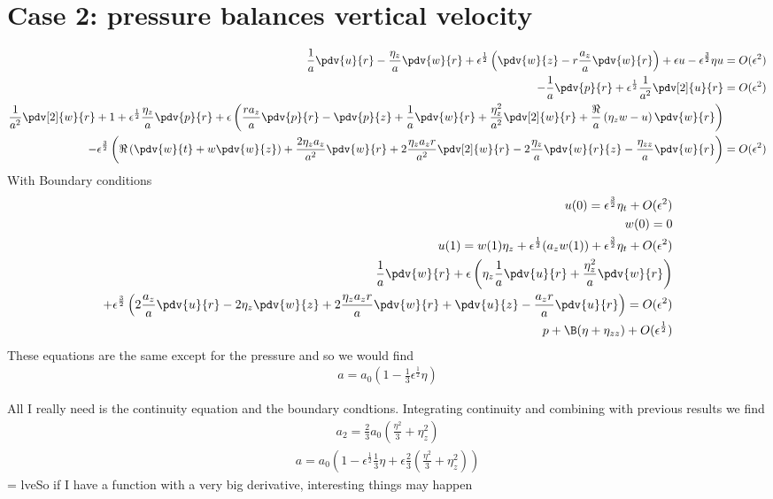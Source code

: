 \documentclass[12pt]{article}
\newcommand{\rt}{^{\frac{1}{2}}}
\newcommand{\rtt}{^{\frac{3}{2}}}
\begin{document}
\section{Case 2: pressure balances vertical velocity}
	\begin{align}
\frac{1}{a}\pdv{u}{r}-\frac{\eta_z}{a}\pdv{w}{r} +\epsilon\rt\left(\pdv{w}{z}-r\frac{a_z}{a}\pdv{w}{r}\right)+\epsilon u -\epsilon\rtt\eta u &= O(\epsilon^2)\\
-\frac{1}{a}\pdv{p}{r}+\epsilon\rt\frac{1}{a^2}\pdv[2]{u}{r} & = O(\epsilon^2)\\
\frac{1}{a^2}\pdv[2]{w}{r} + 1 +\epsilon\rt\frac{\eta_z}{a}\pdv{p}{r}+\epsilon\left(\frac{ra_z}{a}\pdv{p}{r}-\pdv{p}{z}+\frac{1}{a}\pdv{w}{r}+\frac{\eta_z^2}{a^2}\pdv[2]{w}{r}+\frac{\Re}{a}\left(\eta_z w-u\right)\pdv{w}{r}\right)&\\
-\epsilon\rtt\left(\Re\left(\pdv{w}{t}+w\pdv{w}{z}\right)+\frac{2\eta_za_z}{a^2}\pdv{w}{r}+2\frac{\eta_za_zr}{a^2}\pdv[2]{w}{r}-2\frac{\eta_z}{a}\pdv{w}{r}{z}-\frac{\eta_{zz}}{a}\pdv{w}{r}\right)& = O(\epsilon^2)
\end{align}
With Boundary conditions 
\begin{align}
u(0) = \epsilon\rtt\eta_t +O(\epsilon^2)\\
w(0) = 0 \\
u(1) =w(1)\eta_z +\epsilon\rt(a_z w(1)) +\epsilon\rtt\eta_t +O(\epsilon^2)\\
\frac{1}{a}\pdv{w}{r}+\epsilon\left(\eta_z\frac{1}{a}\pdv{u}{r}+\frac{\eta_z^2}{a}\pdv{w}{r}\right)\\
+\epsilon\rtt\left(2\frac{a_z}{a}\pdv{u}{r}-2\eta_z\pdv{w}{z}+2\frac{\eta_za_zr}{a}\pdv{w}{r}+\pdv{u}{z}-\frac{a_zr}{a}\pdv{u}{r}\right)=O(\epsilon^2)\\
p+\B(\eta+\eta_{zz})+ O(\epsilon\rt)
\end{align}
These equations are the same except for the pressure and so we would find
\begin{align}
a = a_0\left(1 -\frac{1}{3}\epsilon\rt\eta\right)
\end{align}

All I really need is the continuity equation and the boundary condtions.
Integrating continuity and combining with previous results we find
\begin{align}
a_2 = \frac{2}{3}a_0\left(\frac{\eta^2}{3}+\eta_z^2\right)\end{align}
\begin{align}
a = a_0\left(1-\epsilon\rt\frac{1}{3}\eta +\epsilon\frac{2}{3}\left(\frac{\eta^2}{3}+\eta_z^2\right)\right)
\end{align}
= lveSo if I have a function with a very big derivative, interesting things may happen
\end{document}
